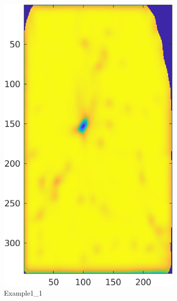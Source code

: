 \documentclass[11pt]{article}
\begin{document}
\begin{figure}[h!]
  \centering
       \begin{subfigure}[t]{0.45\textwidth}
         \centering
         \includegraphics[scale=1.0]{img/qmap_1}
         \caption{Example1\_1}
     \end{subfigure}%
     \quad
     \begin{subfigure}[t]{0.45\textwidth}
         \centering

\end{subfigure}
\end{figure}
\end{document}
